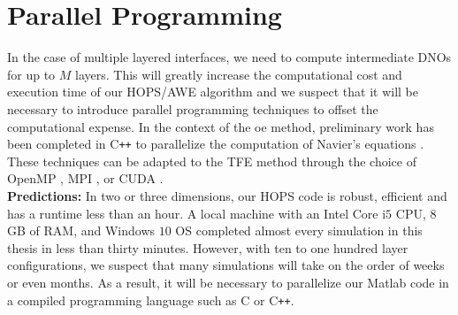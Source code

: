 \section{Parallel Programming}
\setcounter{section}{5}
\label{Sec: Parallel Programming}

In the case of multiple layered interfaces, we need to compute intermediate DNOs for up to $M$ layers. This will greatly increase the computational cost and execution time of our HOPS/AWE algorithm and we suspect that it will be necessary to introduce parallel programming techniques to offset the computational expense. In the context of the \gls{oe} method, preliminary work \cite{fang2015operator} has been completed in C\texttt{++} to parallelize the computation of Navier's equations \cite{BillinghamKing00,achenbach2012wave}. These techniques can be adapted to the TFE method through the choice of OpenMP \cite{chandra2001parallel}, MPI \cite{snir1998mpi}, or CUDA \cite{sanders2010cuda}.
\newline
\\
\textbf{Predictions:} In two or three dimensions, our HOPS code is robust, efficient and has a runtime less than an hour. A local machine with an Intel Core i$5$ CPU, $8$GB of RAM, and Windows $10$ OS completed almost every simulation in this thesis in less than thirty minutes. However, with ten to one hundred layer configurations, we suspect that many simulations will take on the order of weeks or even months. As a result, it will be necessary to parallelize our Matlab code in a compiled programming language such as C or  C\texttt{++}.
